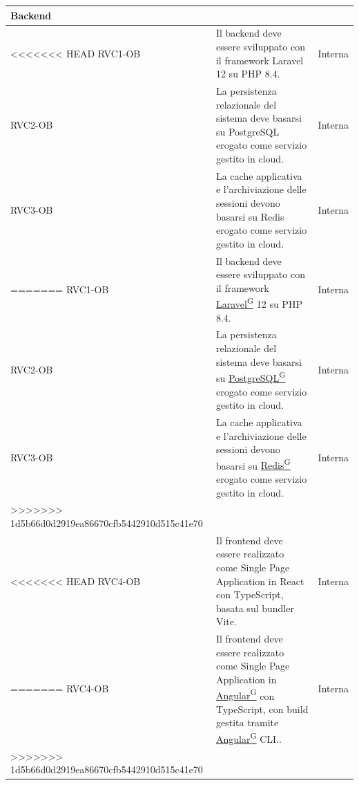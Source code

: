 ﻿\documentclass[a4paper,12pt]{article}
\providecommand{\glslink}[2]{\href{https://alittlebyte-19.github.io/Documentazione/glossario.html\#gls-#1}{\underline{#2}\textsuperscript{\scriptsize G}}}
\begin{document}
\begin{description}[style=multiline, leftmargin=4cm, font=\bfseries]
\begin{enumerate}[leftmargin=*, nosep]
{\begin{longtable}{|p{2.5cm}|p{9.5cm}|p{3.5cm}|}
    
    \multicolumn{3}{|l|}{\cellcolor{gray!12}\textbf{Backend}} \\
    \hline
<<<<<<< HEAD
    RVC1-OB & Il backend deve essere sviluppato con il framework Laravel 12 su PHP 8.4. & Interna \\
    \hline
    RVC2-OB & La persistenza relazionale del sistema deve basarsi su PostgreSQL erogato come servizio gestito in cloud. & Interna \\
    \hline
    RVC3-OB & La cache applicativa e l'archiviazione delle sessioni devono basarsi su Redis erogato come servizio gestito in cloud. & Interna \\
=======
    RVC1-OB & Il backend deve essere sviluppato con il framework \glslink{laravel}{Laravel} 12 su PHP 8.4. & Interna \\
    \hline
    RVC2-OB & La persistenza relazionale del sistema deve basarsi su \glslink{postgresql}{PostgreSQL} erogato come servizio gestito in cloud. & Interna \\
    \hline
    RVC3-OB & La cache applicativa e l'archiviazione delle sessioni devono basarsi su \glslink{redis}{Redis} erogato come servizio gestito in cloud. & Interna \\
>>>>>>> 1d5b66d0d2919ea86670cfb5442910d515c41e70
    \hline

    \multicolumn{3}{|l|}{\cellcolor{gray!12}\textbf{Frontend}} \\
    \hline
<<<<<<< HEAD
    RVC4-OB & Il frontend deve essere realizzato come Single Page Application in React con TypeScript, basata sul bundler Vite. & Interna \\
=======
    RVC4-OB & Il frontend deve essere realizzato come Single Page Application in \glslink{angular}{Angular} con TypeScript, con build gestita tramite \glslink{angular}{Angular} CLI.. & Interna \\
>>>>>>> 1d5b66d0d2919ea86670cfb5442910d515c41e70
    \hline


\end{longtable}}
\end{enumerate}
\end{description}
\end{document}
